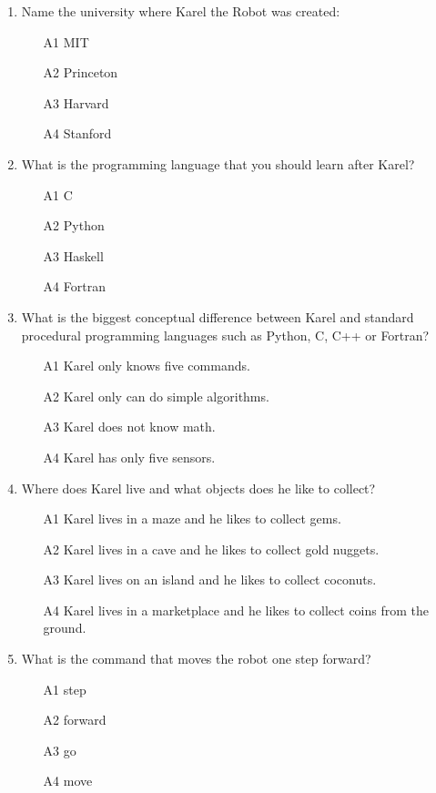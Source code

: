 \documentclass[article,A4,12pt]{llncs}
\begin{document}
\begin{enumerate}
\item Name the university where Karel the Robot was created:
\begin{enumerate}
\item[A1] MIT
\item[A2] Princeton
\item[A3] Harvard
\item[A4] Stanford
\end{enumerate}
\item What is the programming language that you should learn after Karel?
\begin{enumerate}
\item[A1] C
\item[A2] Python
\item[A3] Haskell
\item[A4] Fortran
\end{enumerate}
\item What is the biggest conceptual difference between Karel and standard
      procedural programming languages such as Python, C, C++ or Fortran?
\begin{enumerate}
\item[A1] Karel only knows five commands.
\item[A2] Karel only can do simple algorithms.
\item[A3] Karel does not know math.
\item[A4] Karel has only five sensors.
\end{enumerate}
\item Where does Karel live and what objects does he like to collect?
\begin{enumerate}
\item[A1] Karel lives in a maze and he likes to collect gems.
\item[A2] Karel lives in a cave and he likes to collect gold nuggets.
\item[A3] Karel lives on an island and he likes to collect coconuts.
\item[A4] Karel lives in a marketplace and he likes to collect coins from the ground.
\end{enumerate}
\item What is the command that moves the robot one step forward?
\begin{enumerate}
\item[A1] step
\item[A2] forward
\item[A3] go
\item[A4] move

\end{enumerate}
\end{enumerate}
\end{document}
